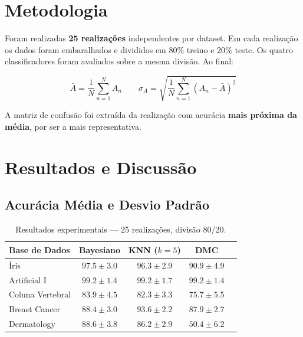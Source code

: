 \documentclass[12pt, a4paper]{article}
\begin{document}
\section{Metodologia}

Foram realizadas \textbf{25 realizações} independentes por dataset.
Em cada realização os dados foram embaralhados e divididos em 80\%
treino e 20\% teste. Os quatro classificadores foram avaliados sobre
a mesma divisão. Ao final:

\begin{equation}
    \bar{A} = \frac{1}{N}\sum_{n=1}^N A_n
    \qquad
    \sigma_A = \sqrt{\frac{1}{N}\sum_{n=1}^N(A_n-\bar{A})^2}
\end{equation}

A matriz de confusão foi extraída da realização com acurácia
\textbf{mais próxima da média}, por ser a mais representativa.

\section{Resultados e Discussão}

\subsection{Acurácia Média e Desvio Padrão}

\begin{table}[H]
    \centering
    \caption{Resultados experimentais --- 25 realizações, divisão 80/20.}
    \label{tab:results}
    \begin{tabular}{@{}lcccc@{}}
        \toprule
        \textbf{Base de Dados} & \textbf{Bayesiano} & \textbf{KNN ($k=5$)} & \textbf{DMC} \\
        \midrule
        Íris             & $97.5 \pm 3.0$ & $96.3 \pm 2.9$ & $90.9 \pm 4.9$ \\
        Artificial I     & $99.2 \pm 1.4$ & $99.2 \pm 1.7$ & $99.2 \pm 1.4$ \\
        Coluna Vertebral & $83.9 \pm 4.5$ & $82.3 \pm 3.3$ & $75.7 \pm 5.5$ \\
        Breast Cancer    & $88.4 \pm 3.0$ & $93.6 \pm 2.2$ & $87.9 \pm 2.7$ \\
        Dermatology      & $88.6 \pm 3.8$ & $86.2 \pm 2.9$ & $50.4 \pm 6.2$ \\
        \bottomrule
    \end{tabular}
\end{table}
\end{document}
